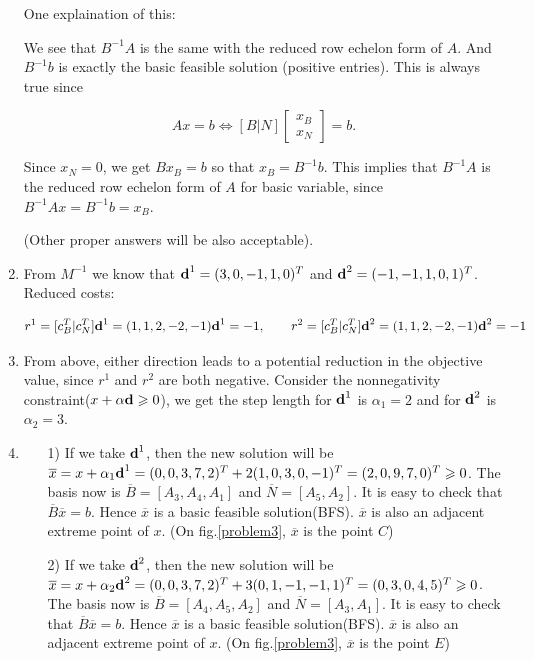 \documentclass[12pt]{article}
\begin{document}
\begin{enumerate}[label = (\alph*)]
One explaination of this:

We see that $B^{-1}A$ is the same with the reduced row echelon form of $A$. And $B^{-1}b$ is exactly the basic feasible solution (positive entries). This is always true since

$$
Ax = b \Leftrightarrow [B | N]\begin{bmatrix}
x_B \\ x_N
\end{bmatrix} = b.
$$

Since $x_N = 0$, we get $Bx_B = b$ so that $x_B = B^{-1}b$. This implies that $B^{-1}A$ is the reduced row echelon form of $A$ for basic variable, since $B^{-1}Ax = B^{-1}b = x_B$.

(Other proper answers will be also acceptable).

\item

From $M^{-1}$ we know that $\textbf d^1 = (3,0,-1,1,0)^T$ and $\textbf d^2 = (-1,-1,1,0,1)^T$. Reduced costs:

$$
r^1 = [c_B^T|c_N^T]\textbf d^1 = (1,1,2,-2,-1)\textbf d^1 = -1, \qquad r^2 = [c_B^T|c_N^T]\textbf d^2 = (1,1,2,-2,-1)\textbf d^2 = -1
$$

\item

From above, either direction leads to a potential reduction in the objective value, since $r^1$ and $r^2$ are both negative. Consider the nonnegativity constraint($x + \alpha \textbf d \geqslant 0$), we get the step length for $\textbf d^1$ is $\alpha_1 = 2$ and for $\textbf d^2$ is $\alpha_2 = 3$.

\item
\begin{enumerate}
\item[1)] If we take $\textbf d^1$, then the new solution will be $\overline{x} = x + \alpha_1 \textbf d^1 = (0,0,3,7,2)^T  + 2(1,0,3,0,-1)^T = (2,0,9,7,0)^T \geqslant 0$. The basis now is $\overline{B} = [A_3, A_4, A_1]$ and $\overline{N} = [A_5, A_2]$. It is easy to check that $\overline{B}\overline x = b$. Hence $\overline{x}$ is a basic feasible solution(BFS). $\overline{x}$ is also an adjacent extreme point of $x$. (On fig.\ref{problem3}, $\overline{x}$ is the point $C$)

\item[2)] If we take $\textbf d^2$, then the new solution will be $\overline{x} = x + \alpha_2 \textbf d^2 = (0,0,3,7,2)^T + 3(0,1,-1,-1,1)^T = (0,3,0,4,5)^T \geqslant 0$. The basis now is $\overline{B} = [A_4, A_5, A_2]$ and $\overline{N} = [A_3, A_1]$. It is easy to check that $\overline{B}\overline x = b$. Hence $\overline{x}$ is a basic feasible solution(BFS). $\overline{x}$ is also an adjacent extreme point of $x$. (On fig.\ref{problem3}, $\overline{x}$ is the point $E$)


\end{enumerate}
\end{enumerate}
\end{document}
